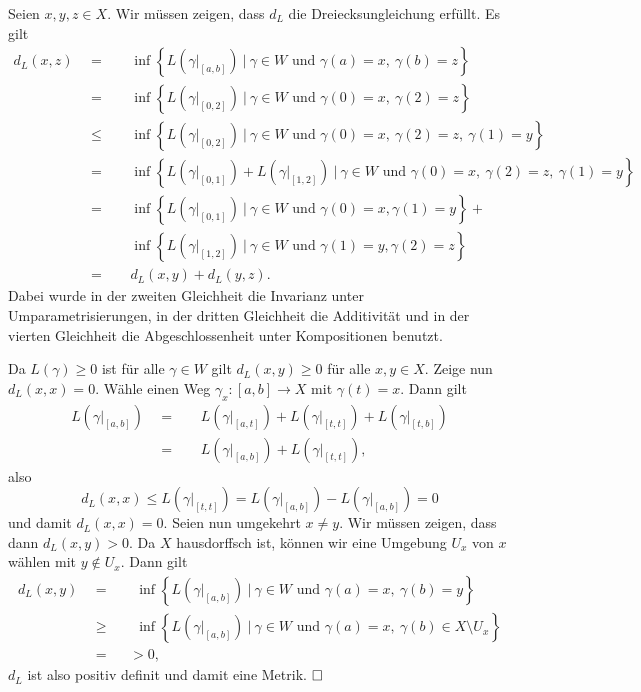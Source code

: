 \documentclass[11pt]{book}
\numberwithin{dummy}{section}
\theoremstyle{nonumberbreak}
\newenvironment{prob}[1][]{\ifthenelse{\equal{#1}{}}{\problem}{\problem[#1]}\rm}{\endproblem}
\newenvironment{sol}[1][]{\ifthenelse{\equal{#1}{}}{\solution}{\solution[#1]}\rm}{\endsolution}
\newcommand{\la}{\longrightarrow}
\begin{document}
\begin{spacing}{1.4}
\begin{prob}
\begin{sol}
\begin{compactenum}
\item Seien $x,y,z\in X$. Wir müssen zeigen, dass $d_L$ die Dreiecksungleichung erfüllt. Es gilt 
\begin{alignat*}{5}
d_L(x,z)\ \  &=&& \ \ \inf \left\{ L(\gamma\vert_{[a,b]}) \ \big\vert \ \gamma \in W \textrm{ und }\gamma(a)=x, \ \gamma(b)=z \right\} \\
&=&& \ \ \inf \left\{ L(\gamma\vert_{[0,2]}) \ \big\vert \ \gamma \in W \textrm{ und }\gamma(0)=x, \ \gamma(2)=z \right\} \\
&\leqslant&& \ \ \inf \left\{ L(\gamma\vert_{[0,2]}) \ \big\vert \ \gamma \in W \textrm{ und }\gamma(0)=x, \ \gamma(2)=z, \ \gamma\left(1\right)=y \right\} \\
&=&& \ \ \inf \left\{ L(\gamma\vert_{[0,1]}) + L(\gamma\vert_{[1,2]}) \ \big\vert \ \gamma \in W \textrm{ und }\gamma(0)=x, \ \gamma(2)=z, \ \gamma\left(1\right)=y \right\} \\
&=&& \ \ \inf \left\{ L(\gamma\vert_{[0,1]}) \ \big\vert \ \gamma \in W \textrm{ und }\gamma(0)=x, \gamma(1)=y\right\} + \\
&&& \ \ \inf \left\{ L(\gamma\vert_{[1,2]}) \ \big\vert \ \gamma \in W \textrm{ und }\gamma(1)=y, \gamma(2)=z\right\}\\
&=&& \ \ d_L(x,y) + d_L(y,z).
\end{alignat*}
Dabei wurde in der zweiten Gleichheit die Invarianz unter Umparametrisierungen, in der dritten Gleichheit die Additivität und in der vierten Gleichheit die Abgeschlossenheit unter Kompositionen benutzt.

\item Da $L(\gamma) \geqslant 0$ ist für alle $\gamma \in W$ gilt $d_L(x,y)\geqslant 0$ für alle $x,y \in X$. Zeige nun $d_L(x,x)=0$. Wähle einen Weg $\gamma_x:[a,b] \la X$ mit $\gamma(t)=x$. Dann gilt
\begin{alignat*}{5}
L(\gamma\vert_{[a,b]}) \ \ &=&& \ \ L(\gamma\vert_{[a,t]}) + L(\gamma\vert_{[t,t]}) + L(\gamma\vert_{[t,b]})\\
&=&& \ \ L(\gamma\vert_{[a,b]}) + L(\gamma\vert_{[t,t]}),
\end{alignat*}
also 
$$d_L(x,x) \leqslant L(\gamma\vert_{[t,t]}) = L(\gamma\vert_{[a,b]}) - L(\gamma\vert_{[a,b]}) =  0$$
und damit $d_L(x,x)=0$. Seien nun umgekehrt $x \neq y$. Wir müssen zeigen, dass dann $d_L(x,y)>0$. Da $X$ hausdorffsch ist, können wir eine Umgebung $U_x$ von $x$ wählen mit $y \notin U_x$. Dann gilt 
\begin{alignat*}{5}
d_L(x,y) \ \ &=&& \ \  \inf \left\{ L(\gamma\vert_{[a,b]}) \ \big\vert \ \gamma \in W \textrm{ und } \gamma(a)=x, \ \gamma(b) = y \right\} \\
&\geqslant && \ \ \inf \left\{ L(\gamma\vert_{[a,b]}) \ \big\vert \ \gamma \in W \textrm{ und } \gamma(a)=x, \ \gamma(b) \in X \setminus U_x \right\}\\
&=&& >0,
\end{alignat*}
$d_L$ ist also positiv definit und damit eine Metrik. $\hfill \Box$
\end{compactenum}


\end{sol}
\end{prob}
\end{spacing}
\end{document}
